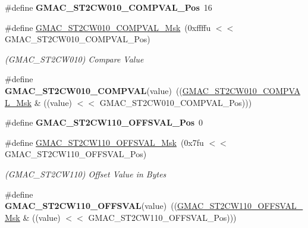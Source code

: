 \begin{DoxyCompactItemize}
\item 
\mbox{\label{group__SAMV71__GMAC_gaa515177736a3b0934bc239936f21034b}} 
\#define {\bfseries G\+M\+A\+C\+\_\+\+S\+T2\+C\+W010\+\_\+\+C\+O\+M\+P\+V\+A\+L\+\_\+\+Pos}~16
\item 
\mbox{\label{group__SAMV71__GMAC_ga4701b7e736bd16894d3adbd39df6cb4d}} 
\#define \mbox{\hyperlink{group__SAMV71__GMAC_ga4701b7e736bd16894d3adbd39df6cb4d}{G\+M\+A\+C\+\_\+\+S\+T2\+C\+W010\+\_\+\+C\+O\+M\+P\+V\+A\+L\+\_\+\+Msk}}~(0xffffu $<$$<$ G\+M\+A\+C\+\_\+\+S\+T2\+C\+W010\+\_\+\+C\+O\+M\+P\+V\+A\+L\+\_\+\+Pos)
\begin{DoxyCompactList}\small\item\em (G\+M\+A\+C\+\_\+\+S\+T2\+C\+W010) Compare Value \end{DoxyCompactList}\item 
\mbox{\label{group__SAMV71__GMAC_gab84d35c9c5ea53ee2d35a56b84c54e58}} 
\#define {\bfseries G\+M\+A\+C\+\_\+\+S\+T2\+C\+W010\+\_\+\+C\+O\+M\+P\+V\+AL}(value)~((\mbox{\hyperlink{group__SAMV71__GMAC_ga4701b7e736bd16894d3adbd39df6cb4d}{G\+M\+A\+C\+\_\+\+S\+T2\+C\+W010\+\_\+\+C\+O\+M\+P\+V\+A\+L\+\_\+\+Msk}} \& ((value) $<$$<$ G\+M\+A\+C\+\_\+\+S\+T2\+C\+W010\+\_\+\+C\+O\+M\+P\+V\+A\+L\+\_\+\+Pos)))
\item 
\mbox{\label{group__SAMV71__GMAC_gad0497d4daf57710a4d901ba0c3ce29e2}} 
\#define {\bfseries G\+M\+A\+C\+\_\+\+S\+T2\+C\+W110\+\_\+\+O\+F\+F\+S\+V\+A\+L\+\_\+\+Pos}~0
\item 
\mbox{\label{group__SAMV71__GMAC_ga4e4798bf1c6d7bf2e4c126bbc58dd942}} 
\#define \mbox{\hyperlink{group__SAMV71__GMAC_ga4e4798bf1c6d7bf2e4c126bbc58dd942}{G\+M\+A\+C\+\_\+\+S\+T2\+C\+W110\+\_\+\+O\+F\+F\+S\+V\+A\+L\+\_\+\+Msk}}~(0x7fu $<$$<$ G\+M\+A\+C\+\_\+\+S\+T2\+C\+W110\+\_\+\+O\+F\+F\+S\+V\+A\+L\+\_\+\+Pos)
\begin{DoxyCompactList}\small\item\em (G\+M\+A\+C\+\_\+\+S\+T2\+C\+W110) Offset Value in Bytes \end{DoxyCompactList}\item 
\mbox{\label{group__SAMV71__GMAC_ga0fb76e9748e4a57a251267655017f3fc}} 
\#define {\bfseries G\+M\+A\+C\+\_\+\+S\+T2\+C\+W110\+\_\+\+O\+F\+F\+S\+V\+AL}(value)~((\mbox{\hyperlink{group__SAMV71__GMAC_ga4e4798bf1c6d7bf2e4c126bbc58dd942}{G\+M\+A\+C\+\_\+\+S\+T2\+C\+W110\+\_\+\+O\+F\+F\+S\+V\+A\+L\+\_\+\+Msk}} \& ((value) $<$$<$ G\+M\+A\+C\+\_\+\+S\+T2\+C\+W110\+\_\+\+O\+F\+F\+S\+V\+A\+L\+\_\+\+Pos)))

\end{DoxyCompactItemize}
